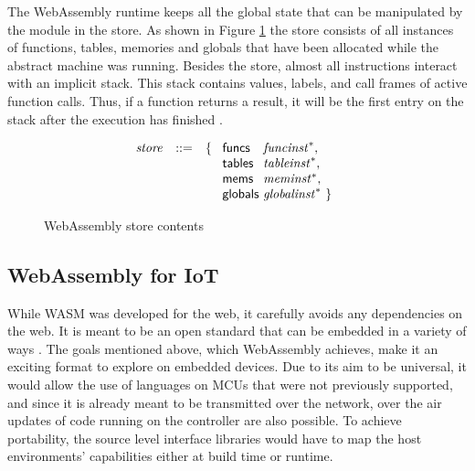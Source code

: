 The WebAssembly runtime keeps all the global state that can be manipulated by the module in the store. As shown in Figure \ref{fig:store_content} the store consists of all instances of functions, tables, memories and globals that have been allocated while the abstract machine was running. Besides the store, almost all instructions interact with an implicit stack. This stack contains values, labels, and call frames of active function calls. Thus, if a function returns a result, it will be the first entry on the stack after the execution has finished \autocite{noauthor_runtime_nodate}.

\begin{figure}[h]
    \begin{equation}\nonumber
        \begin{split}
            \begin{array}{llll}
            \mathit{store} &::=& \{~
            \begin{array}[t]{l@{~}ll}
                \mathsf{funcs} & \mathit{funcinst}^\ast, \\
                \mathsf{tables} & \mathit{tableinst}^\ast, \\
                \mathsf{mems} & \mathit{meminst}^\ast, \\
                \mathsf{globals} & \mathit{globalinst}^\ast ~\} \\
            \end{array}
            \end{array}
        \end{split}
    \end{equation}
    \caption{WebAssembly store contents}
    \label{fig:store_content}
\end{figure}

\subsection{WebAssembly for IoT}

While WASM was developed for the web, it carefully avoids any dependencies on the web. It is meant to be an open standard that can be embedded in a variety of ways \autocite{noauthor_non-web_nodate}. The goals mentioned above, which WebAssembly achieves, make it an exciting format to explore on embedded devices. Due to its aim to be universal, it would allow the use of languages on MCUs that were not previously supported, and since it is already meant to be transmitted over the network, over the air updates of code running on the controller are also possible. To achieve portability, the source level interface libraries would have to map the host environments' capabilities either at build time or runtime.

